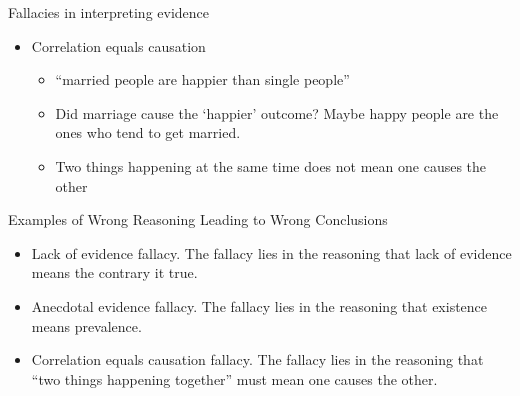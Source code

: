 \documentclass[14pt]{beamer}\usepackage[]{graphicx}\usepackage[]{color}
\begin{document}
\begin{frame}[fragile]{Fallacies in interpreting evidence}

\begin{itemize}
\item Correlation equals causation
  \begin{itemize}
  \item ``married people are happier than single people''
  \item Did marriage cause the `happier' outcome?  Maybe happy people are the ones who tend to get married.
  \item Two things happening at the same time does not mean one causes the other
  \end{itemize}
\end{itemize}
\end{frame}

\begin{frame}[fragile]{Examples of Wrong Reasoning Leading to Wrong Conclusions}

\begin{itemize}
\item Lack of evidence fallacy.  The fallacy lies in the reasoning that lack of evidence means the contrary it true.
\item Anecdotal evidence fallacy.  The fallacy lies in the reasoning that existence means prevalence.
\item Correlation equals causation fallacy.  The fallacy lies in the reasoning that ``two things happening together'' must mean one causes the other.
\end{itemize}
\end{frame}
\end{document}
